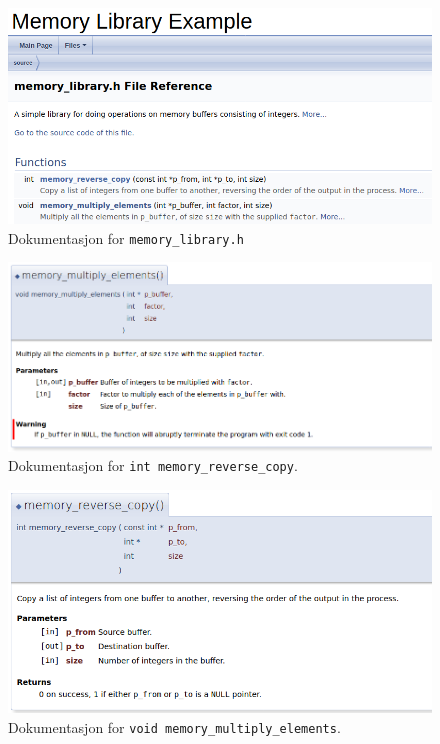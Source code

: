 \begin{alphasection}
\begin{figure}[H]
    \centering
    \includegraphics[width=131mm]{figures/doxygenfil2.png}
    \caption{Dokumentasjon for \texttt{memory\_library.h}}
    \label{fig:2-dox-fig2}
\end{figure}

\begin{figure}[H]
    \centering
    \includegraphics[width=135mm]{figures/doxygenfil3.png}
    \caption{Dokumentasjon for \texttt{int memory\_reverse\_copy}.}
    \label{fig:2-dox-fig3}
\end{figure}



\begin{figure}[H]
    \centering
    \includegraphics[width=135mm]{figures/doxygen4.png}
    \caption{Dokumentasjon for \texttt{void memory\_multiply\_elements}.}
    \label{fig:2-dox-fig4}
\end{figure}

\end{alphasection}


\setcounter{section}{0}